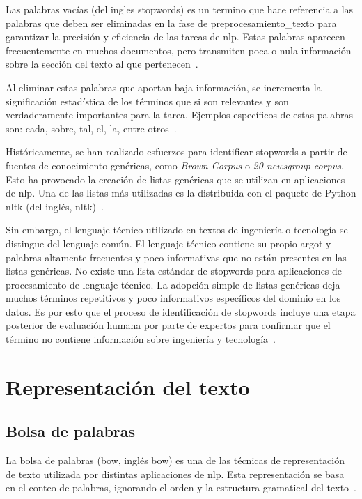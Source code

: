 Las palabras vacías (del ingles \gls{stopwords}) es un termino que hace
referencia a las palabras que deben ser eliminadas en la fase de
\gls{preprocesamiento_texto} para garantizar la precisión y eficiencia de las
tareas de \acrshort{nlp}. Estas palabras aparecen frecuentemente en muchos
documentos, pero transmiten poca o nula información sobre la sección del texto
al que pertenecen~\cite{sarica2021stopwords}.

Al eliminar estas palabras que aportan baja información, se incrementa la
significación estadística de los términos que si son relevantes y son
verdaderamente importantes para la tarea. Ejemplos específicos de estas
palabras son: cada, sobre, tal, el, la, entre otros~\cite{sarica2021stopwords}.

Históricamente, se han realizado esfuerzos para identificar \gls{stopwords} a
partir de fuentes de conocimiento genéricas, como \textit{Brown Corpus} o
\textit{20 newsgroup corpus}. Esto ha provocado la creación de listas genéricas
que se utilizan en aplicaciones de \acrshort{nlp}. Una de las listas más
utilizadas es la distribuida con el paquete de Python \acrshort{nltk} (del
inglés, \Acrlong{nltk})~\cite{sarica2021stopwords}.

Sin embargo, el lenguaje técnico utilizado en textos de ingeniería o tecnología
se distingue del lenguaje común. El lenguaje técnico contiene su propio argot y
palabras altamente frecuentes y poco informativas que no están presentes en las
listas genéricas. No existe una lista estándar de \gls{stopwords} para
aplicaciones de procesamiento de lenguaje técnico. La adopción simple de listas
genéricas deja muchos términos repetitivos y poco informativos específicos del
dominio en los datos. Es por esto que el proceso de identificación de
\gls{stopwords} incluye una etapa posterior de evaluación humana por parte de
expertos para confirmar que el término no contiene información sobre ingeniería
y tecnología~\cite{sarica2021stopwords}.

\section{Representación del texto}

\subsection{Bolsa de palabras}

La bolsa de palabras (\acrshort{bow}, inglés \acrlong{bow}) es una de las
técnicas de representación de texto utilizada por distintas aplicaciones de
\acrshort{nlp}. Esta representación se basa en el conteo de palabras, ignorando
el orden y la estructura gramatical del
texto~\cite{hankarComprehensiveOverviewTopic2025}.

